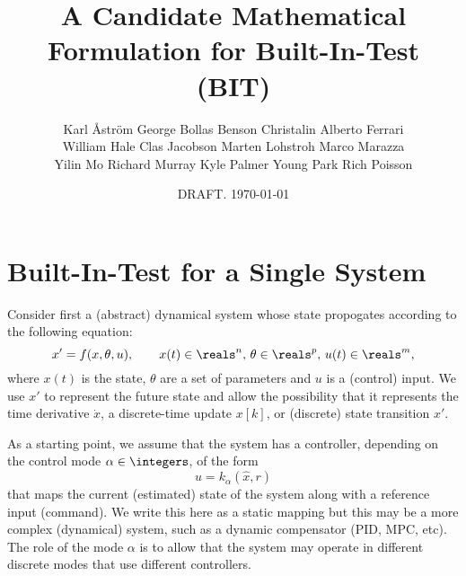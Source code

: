 \documentclass{article}
\begin{document}
\title{A Candidate Mathematical Formulation for Built-In-Test (BIT)}
\author{
  Karl {\AA}str\"{o}m \qquad
  George Bollas \qquad
  Benson Christalin \qquad
  Alberto Ferrari \\
  William Hale \qquad
  Clas Jacobson \qquad
  Marten Lohstroh \qquad
  Marco Marazza \\
  Yilin Mo \qquad
  Richard Murray \qquad
  Kyle Palmer \qquad
  Young Park \qquad
  Rich Poisson
}
\date{DRAFT. \today}
\maketitle

\section{Built-In-Test for a Single System}

Consider first a (abstract) dynamical system whose state propogates
according to the following equation:
\begin{displaymath}
  x' = f(x, \theta, u), \qquad x(t)\in\reals^n,\, \theta\in\reals^p,\,
  u(t) \in\reals^m,
\end{displaymath}
where $x(t)$ is the state, $\theta$ are a set of parameters and $u$ is a
(control) input.  We use $x'$ to represent the future state and
allow the possibility that it represents the time derivative $\dot x$,
a discrete-time update $x[k]$, or (discrete) state transition $x'$.

As a starting point, we assume that the system has a controller,
depending on the control mode $\alpha \in \integers$, of the
form $$u = k_\alpha(\hat x, r)$$ that maps the current (estimated) state of the
system along with a reference input (command).  We write this here as
a static mapping but this may be a more complex (dynamical) system,
such as a dynamic compensator (PID, MPC, etc).  The role of the mode
$\alpha$ is to allow that the system may operate in different discrete
modes that use different controllers.
\end{document}

